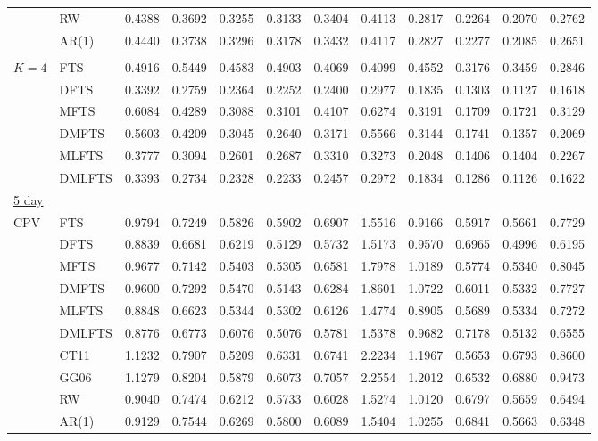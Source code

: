 \documentclass[12pt,a4paper]{article}
\begin{document}
\begin{center}
\begin{small}
\begin{longtable}{@{}llrrrrrrrrrr@{}}
  & RW & 0.4388 & 0.3692 & 0.3255 & 0.3133 & 0.3404 & 0.4113 & 0.2817 & 0.2264 & 0.2070 & 0.2762 \\ 
  & AR(1) & 0.4440 & 0.3738 & 0.3296 & 0.3178 & 0.3432 & 0.4117 & 0.2827 & 0.2277 & 0.2085 & 0.2651 \\ 
\\
  $K=4$ & FTS & 0.4916 & 0.5449 & 0.4583 & 0.4903 & 0.4069 & 0.4099 & 0.4552 & 0.3176 & 0.3459 & 0.2846 \\ 
  & DFTS & 0.3392 & 0.2759 & 0.2364 & 0.2252 & 0.2400 & 0.2977 & 0.1835 & 0.1303 & 0.1127 & 0.1618 \\ 
  & MFTS & 0.6084 & 0.4289 & 0.3088 & 0.3101 & 0.4107 & 0.6274 & 0.3191 & 0.1709 & 0.1721 & 0.3129 \\ 
  & DMFTS & 0.5603 & 0.4209 & 0.3045 & 0.2640 & 0.3171 & 0.5566 & 0.3144 & 0.1741 & 0.1357 & 0.2069 \\ 
  & MLFTS & 0.3777 & 0.3094 & 0.2601 & 0.2687 & 0.3310 & 0.3273 & 0.2048 & 0.1406 & 0.1404 & 0.2267 \\ 
  & DMLFTS & 0.3393 & 0.2734 & 0.2328 & 0.2233 & 0.2457 & 0.2972 & 0.1834 & 0.1286 & 0.1126 & 0.1622 \\ 
\underline{5 day} \\
CPV & FTS & 0.9794 & 0.7249 & 0.5826 & 0.5902 & 0.6907 & 1.5516 & 0.9166 & 0.5917 & 0.5661 & 0.7729 \\ 
  & DFTS & 0.8839 & 0.6681 & 0.6219 & 0.5129 & 0.5732 & 1.5173 & 0.9570 & 0.6965 & 0.4996 & 0.6195 \\ 
  & MFTS & 0.9677 & 0.7142 & 0.5403 & 0.5305 & 0.6581 & 1.7978 & 1.0189 & 0.5774 & 0.5340 & 0.8045 \\ 
  & DMFTS & 0.9600 & 0.7292 & 0.5470 & 0.5143 & 0.6284 & 1.8601 & 1.0722 & 0.6011 & 0.5332 & 0.7727 \\ 
  & MLFTS & 0.8848 & 0.6623 & 0.5344 & 0.5302 & 0.6126 & 1.4774 & 0.8905 & 0.5689 & 0.5334 & 0.7272 \\ 
  & DMLFTS & 0.8776 & 0.6773 & 0.6076 & 0.5076 & 0.5781 & 1.5378 & 0.9682 & 0.7178 & 0.5132 & 0.6555 \\ 
  & CT11 & 1.1232 & 0.7907 & 0.5209 & 0.6331 & 0.6741 & 2.2234 & 1.1967 & 0.5653 & 0.6793 & 0.8600 \\ 
  & GG06 & 1.1279 & 0.8204 & 0.5879 & 0.6073 & 0.7057 & 2.2554 & 1.2012 & 0.6532 & 0.6880 & 0.9473 \\ 
  & RW & 0.9040 & 0.7474 & 0.6212 & 0.5733 & 0.6028 & 1.5274 & 1.0120 & 0.6797 & 0.5659 & 0.6494 \\ 
  & AR(1) & 0.9129 & 0.7544 & 0.6269 & 0.5800 & 0.6089 & 1.5404 & 1.0255 & 0.6841 & 0.5663 & 0.6348 \\ 

\end{longtable}
\end{small}
\end{center}
\end{document}
